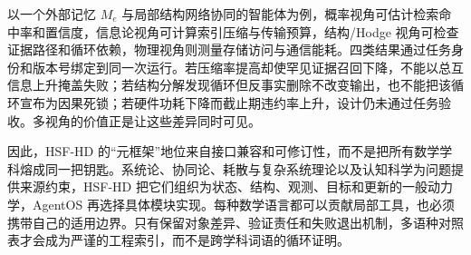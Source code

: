以一个外部记忆 $M_e$ 与局部结构网络协同的智能体为例，概率视角可估计检索命中率和置信度，信息论视角可计算索引压缩与传输预算，结构/Hodge 视角可检查证据路径和循环依赖，物理视角则测量存储访问与通信能耗。四类结果通过任务身份和版本号绑定到同一次运行。若压缩率提高却使罕见证据召回下降，不能以总互信息上升掩盖失败；若结构分解发现循环但反事实删除不改变输出，也不能把该循环宣布为因果死锁；若硬件功耗下降而截止期违约率上升，设计仍未通过任务验收。多视角的价值正是让这些差异同时可见。

因此，HSF-HD 的“元框架”地位来自接口兼容和可修订性，而不是把所有数学学科熔成同一把钥匙。系统论、协同论、耗散与复杂系统理论以及认知科学为问题提供来源约束，HSF-HD 把它们组织为状态、结构、观测、目标和更新的一般动力学，AgentOS 再选择具体模块实现。每种数学语言都可以贡献局部工具，也必须携带自己的适用边界。只有保留对象差异、验证责任和失败退出机制，多语种对照表才会成为严谨的工程索引，而不是跨学科词语的循环证明。

